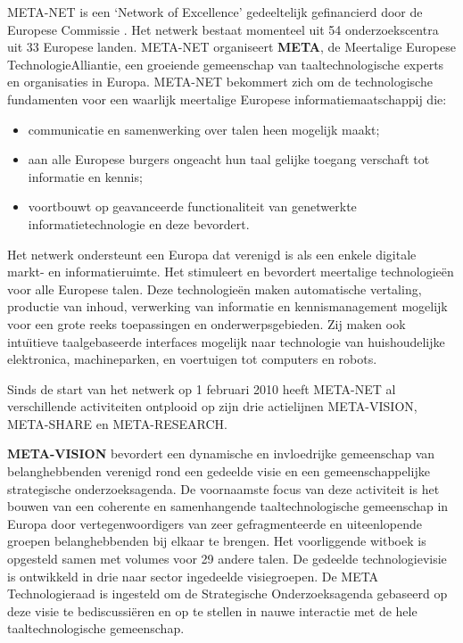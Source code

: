 \begin{multicols}{2}

    META-NET is een `Network of Excellence' gedeeltelijk gefinancierd door de Europese Commissie \cite{rehm2011}. Het netwerk bestaat momenteel uit 54 onderzoekscentra uit 33 Europese landen. META-NET organiseert \textbf{META}, de Meertalige Europese TechnologieAlliantie, een groeiende gemeenschap van taaltechnologische experts en organisaties in Europa.
     META-NET bekommert zich om de technologische fundamenten voor een waarlijk meertalige Europese informatiemaatschappij die:
    \begin{itemize}
 	\item communicatie en samenwerking over talen heen mogelijk maakt;
 	\item aan alle Europese burgers ongeacht hun taal gelijke toegang verschaft tot  informatie en kennis;
 	\item voortbouwt op geavanceerde functionaliteit van genetwerkte informatietechnologie en deze bevordert.
    \end{itemize}

    Het netwerk ondersteunt een Europa dat verenigd is als een enkele digitale markt- en informatieruimte.
    Het stimuleert en bevordert meertalige technologie{\"e}n voor alle Europese talen. Deze technologie{\"e}n maken automatische vertaling, productie van inhoud, verwerking van informatie en kennismanagement mogelijk voor een grote reeks toepassingen en onderwerpsgebieden.     Zij maken ook intu{\"\i}tieve taalgebaseerde interfaces mogelijk naar technologie van huishoudelijke elektronica, machineparken, en voertuigen tot computers en robots.

Sinds de start van het netwerk op 1 februari 2010 heeft META-NET al verschillende activiteiten ontplooid op zijn drie actielijnen  META-VISION, META-SHARE en META-RESEARCH.

    \textbf{META-VISION} bevordert een dynamische en invloedrijke gemeenschap van belanghebbenden verenigd rond een gedeelde visie en een gemeenschappelijke strategische onderzoeksagenda. De voornaamste focus van deze activiteit is het bouwen van een coherente en samenhangende taaltechnologische gemeenschap in Europa door vertegenwoordigers van zeer gefragmenteerde en uiteenlopende groepen belanghebbenden bij elkaar te brengen. Het voorliggende witboek is opgesteld samen met volumes voor 29 andere talen. De gedeelde technologievisie is ontwikkeld in drie naar sector ingedeelde visiegroepen. De  META Technologieraad is ingesteld om de Strategische Onderzoeksagenda gebaseerd op deze visie te bediscussi{\"e}ren en op te stellen in nauwe interactie met de hele taaltechnologische gemeenschap.



\end{multicols}

